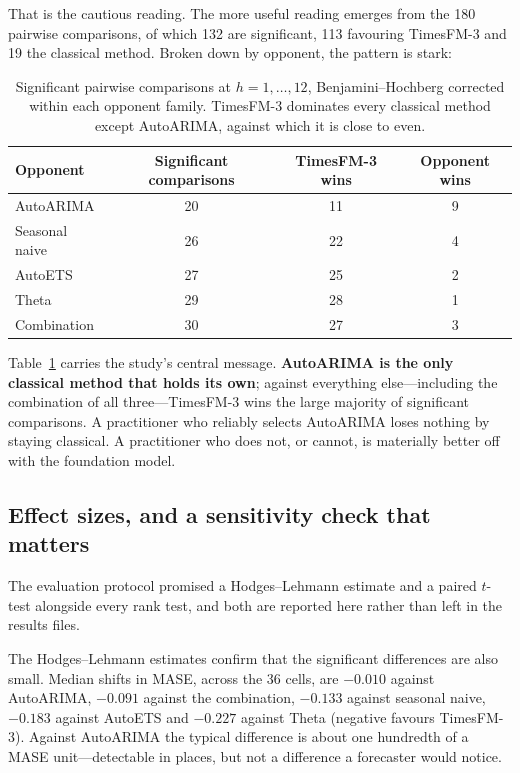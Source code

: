 \documentclass[article]{ajs}
\providecommand{\tableref}[1]{Table~\ref{#1}}
\begin{document}
That is the cautious reading. The more useful reading emerges from the 180 pairwise
comparisons, of which 132 are significant, 113 favouring TimesFM-3 and 19 the classical
method. Broken down by opponent, the pattern is stark:

\begin{table}[t!]
\centering
\caption{Significant pairwise comparisons at $h = 1,\dots,12$, Benjamini--Hochberg corrected
within each opponent family. TimesFM-3 dominates every classical method except AutoARIMA,
against which it is close to even.}
\label{tab:opponents}
\begin{tabular}{lccc}
\toprule
Opponent & Significant comparisons & TimesFM-3 wins & Opponent wins \\
\midrule
AutoARIMA          & 20 & 11 & 9 \\
Seasonal naive     & 26 & 22 & 4 \\
AutoETS            & 27 & 25 & 2 \\
Theta              & 29 & 28 & 1 \\
Combination        & 30 & 27 & 3 \\
\bottomrule
\end{tabular}
\end{table}

\tableref{tab:opponents} carries the study's central message. \textbf{AutoARIMA is the only
classical method that holds its own}; against everything else---including the combination of
all three---TimesFM-3 wins the large majority of significant comparisons. A practitioner who
reliably selects AutoARIMA loses nothing by staying classical. A practitioner who does not, or
cannot, is materially better off with the foundation model.

\subsection{Effect sizes, and a sensitivity check that matters}

The evaluation protocol promised a Hodges--Lehmann estimate and a paired $t$-test alongside every
rank test, and both are reported here rather than left in the results files.

The Hodges--Lehmann estimates confirm that the significant differences are also small. Median
shifts in MASE, across the 36 cells, are $-0.010$ against AutoARIMA, $-0.091$ against the
combination, $-0.133$ against seasonal naive, $-0.183$ against AutoETS and $-0.227$ against Theta
(negative favours TimesFM-3). Against AutoARIMA the typical difference is about one hundredth of
a MASE unit---detectable in places, but not a difference a forecaster would notice.
\end{document}
